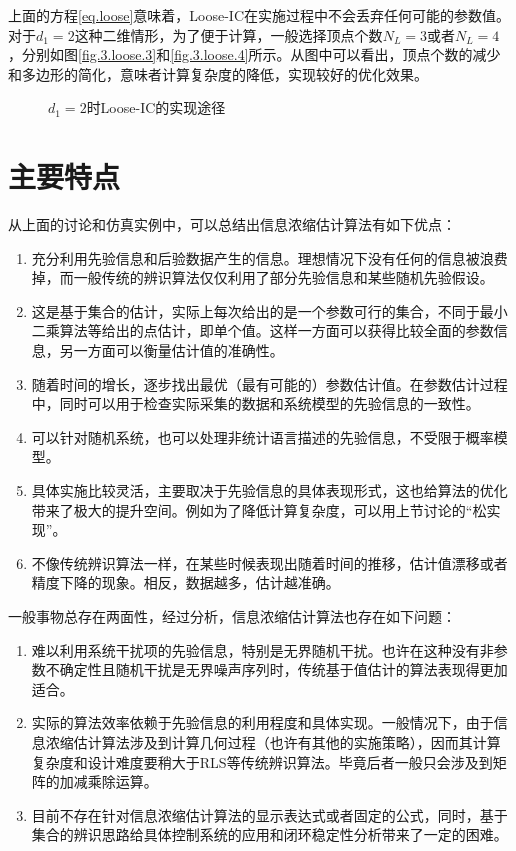 上面的方程\eqref{eq.loose}意味着，Loose-IC在实施过程中不会丢弃任何可能的参数值。对于$d_{1}=2$这种二维情形，为了便于计算，一般选择顶点个数$N_{L}=3$或者$N_{L}=4$，分别如图\ref{fig.3.loose.3}和\ref{fig.3.loose.4}所示。从图中可以看出，顶点个数的减少和多边形的简化，意味者计算复杂度的降低，实现较好的优化效果。

\begin{figure}[!h]
	\centering
	\caption{$d_{1}=2$时Loose-IC的实现途径}	 %
	\label{fig.3.loose}	 %
\end{figure}

\section{主要特点}\label{sect:3.6}
从上面的讨论和仿真实例中，可以总结出信息浓缩估计算法有如下优点：
\begin{enumerate}
\item 充分利用先验信息和后验数据产生的信息。理想情况下没有任何的信息被浪费掉，而一般传统的辨识算法仅仅利用了部分先验信息和某些随机先验假设。
\item 这是基于集合的估计，实际上每次给出的是一个参数可行的集合，不同于最小二乘算法等给出的点估计，即单个值。这样一方面可以获得比较全面的参数信息，另一方面可以衡量估计值的准确性。
\item 随着时间的增长，逐步找出最优（最有可能的）参数估计值。在参数估计过程中，同时可以用于检查实际采集的数据和系统模型的先验信息的一致性。
\item 可以针对随机系统，也可以处理非统计语言描述的先验信息，不受限于概率模型。
\item 具体实施比较灵活，主要取决于先验信息的具体表现形式，这也给算法的优化带来了极大的提升空间。例如为了降低计算复杂度，可以用上节讨论的“松实现”。
\item 不像传统辨识算法一样，在某些时候表现出随着时间的推移，估计值漂移或者精度下降的现象。相反，数据越多，估计越准确。
\end{enumerate}

一般事物总存在两面性，经过分析，信息浓缩估计算法也存在如下问题：
\begin{enumerate}
\item 难以利用系统干扰项的先验信息，特别是无界随机干扰。也许在这种没有非参数不确定性且随机干扰是无界噪声序列时，传统基于值估计的算法表现得更加适合。
\item 实际的算法效率依赖于先验信息的利用程度和具体实现。一般情况下，由于信息浓缩估计算法涉及到计算几何过程（也许有其他的实施策略），因而其计算复杂度和设计难度要稍大于RLS等传统辨识算法。毕竟后者一般只会涉及到矩阵的加减乘除运算。
\item 目前不存在针对信息浓缩估计算法的显示表达式或者固定的公式，同时，基于集合的辨识思路给具体控制系统的应用和闭环稳定性分析带来了一定的困难。
\end{enumerate}

